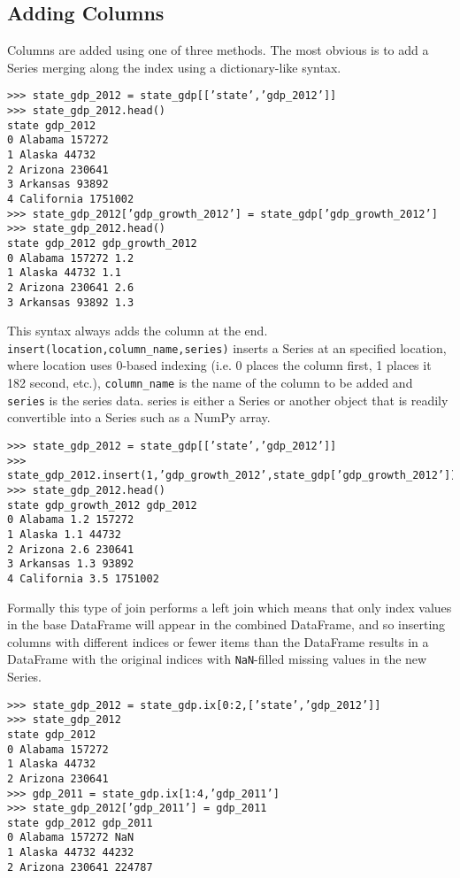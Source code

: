 \documentclass[KSmain.tex]{subfiles}
\begin{document}
\subsection{Adding Columns}
Columns are added using one of three methods. The most obvious is to add a Series merging along the
index using a dictionary-like syntax.
\begin{framed}
\begin{verbatim}
>>> state_gdp_2012 = state_gdp[[’state’,’gdp_2012’]]
>>> state_gdp_2012.head()
state gdp_2012
0 Alabama 157272
1 Alaska 44732
2 Arizona 230641
3 Arkansas 93892
4 California 1751002
>>> state_gdp_2012[’gdp_growth_2012’] = state_gdp[’gdp_growth_2012’]
>>> state_gdp_2012.head()
state gdp_2012 gdp_growth_2012
0 Alabama 157272 1.2
1 Alaska 44732 1.1
2 Arizona 230641 2.6
3 Arkansas 93892 1.3
\end{verbatim}
\end{framed}
This syntax always adds the column at the end. \texttt{insert(location,column\_name,series)} inserts a Series
at an specified location, where location uses 0-based indexing (i.e. 0 places the column first, 1 places it
182
second, etc.), \texttt{column\_name} is the name of the column to be added and \texttt{series} is the series data. series is
either a Series or another object that is readily convertible into a Series such as a NumPy array.
\begin{framed}
\begin{verbatim}
>>> state_gdp_2012 = state_gdp[[’state’,’gdp_2012’]]
>>> state_gdp_2012.insert(1,’gdp_growth_2012’,state_gdp[’gdp_growth_2012’])
>>> state_gdp_2012.head()
state gdp_growth_2012 gdp_2012
0 Alabama 1.2 157272
1 Alaska 1.1 44732
2 Arizona 2.6 230641
3 Arkansas 1.3 93892
4 California 3.5 1751002
\end{verbatim}
\end{framed}
Formally this type of join performs a left join which means that only index values in the base DataFrame
will appear in the combined DataFrame, and so inserting columns with different indices or fewer items
than the DataFrame results in a DataFrame with the original indices with \texttt{NaN}-filled missing values in the
new Series.
\begin{framed}
\begin{verbatim}
>>> state_gdp_2012 = state_gdp.ix[0:2,[’state’,’gdp_2012’]]
>>> state_gdp_2012
state gdp_2012
0 Alabama 157272
1 Alaska 44732
2 Arizona 230641
>>> gdp_2011 = state_gdp.ix[1:4,’gdp_2011’]
>>> state_gdp_2012[’gdp_2011’] = gdp_2011
state gdp_2012 gdp_2011
0 Alabama 157272 NaN
1 Alaska 44732 44232
2 Arizona 230641 224787
\end{verbatim}
\end{framed}
\end{document}
